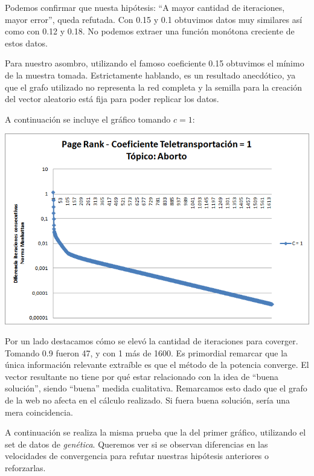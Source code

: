 	Podemos confirmar que nuesta hipótesis: ``A mayor cantidad de iteraciones, mayor error'', queda refutada. Con 0.15 y 0.1 obtuvimos datos muy similares así como con 0.12 y 0.18. No podemos extraer una función monótona creciente de estos datos. 

	Para nuestro asombro, utilizando el famoso coeficiente 0.15 obtuvimos el mínimo de la muestra tomada. Estrictamente hablando, es un resultado anecdótico, ya que el grafo utilizado no representa la red completa y la semilla para la creación del vector aleatorio está fija para poder replicar los datos.

	A continuación se incluye el gráfico tomando $c = 1$:

	\par 
	\begin{center}
		\includegraphics[scale=0.6]{./img/page_rank_variacion_coef_teletransportacion_1.png}
	\end{center}
	\par 

	Por un lado destacamos cómo se elevó la cantidad de iteraciones para coverger. Tomando 0.9 fueron 47, y con 1 más de 1600. Es primordial remarcar que la única información relevante extraíble es que el método de la potencia converge. El vector resultante no tiene por qué estar relacionado con la idea de ``buena solución'', siendo ``buena'' medida cualitativa. Remarcamos esto dado que el grafo de la web no afecta en el cálculo realizado. Si fuera buena solución, sería una mera coincidencia.

	A continuación se realiza la misma prueba que la del primer gráfico, utilizando el set de datos de \textit{genética}. Queremos ver si se observan diferencias en las velocidades de convergencia para refutar nuestras hipótesis anteriores o reforzarlas.

